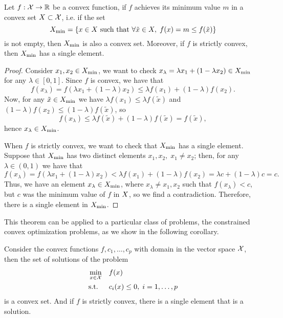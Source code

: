 \begin{theorem}
    Let $f: \mathcal{X} \to \mathbb{R}$ be a convex function, if $f$ achieves its minimum value $m$ in a convex set $X \subset \mathcal{X}$, i.e. if the set 
    $$ X_{\min} = \left\{x \in X \text{ such that }  \forall \tilde{x} \in X, \;  f(x) = m \leq f(\tilde{x})\right\}$$
    is not empty, then $X_{\min}$ is also a convex set. 
    Moreover, if $f$ is strictly convex, then $X_{\min}$ has a single element.
\end{theorem}
\begin{proof}
    Consider $x_1, x_2 \in X_{\min}$, we want to check $x_\lambda = \lambda x_1 + (1 - \lambda x_2) \in X_{\min}$ for any $\lambda \in [0, 1]$.
    Since $f$ is convex, we have that
    \begin{equation}
        \nonumber
        f(x_\lambda) = f(\lambda x_1 + (1 - \lambda) x_2) \leq \lambda f(x_1) + (1 - \lambda) f(x_2) .
    \end{equation}
    Now, for any $\tilde{x} \in X_{\min}$ we have $\lambda f(x_1) \leq \lambda f(\tilde{x})$ and $(1 - \lambda) f(x_2) \leq (1 - \lambda) f(\tilde{x})$, so 
    $$f(x_\lambda) \leq  \lambda f(\tilde{x}) + (1 - \lambda) f(\tilde{x}) = f(\tilde{x}),$$ hence $x_\lambda \in X_{\min}$.

    When $f$ is strictly convex, we want to check that $X_{\min}$ has a single element. Suppose that $X_{\min}$ has two distinct elements $x_1, x_2, \; x_1 \neq x_2$; then, for any $\lambda \in (0, 1)$ we have that 
    $$ f(x_\lambda) = f(\lambda x_1 + (1 - \lambda) x_2) < \lambda f(x_1) + (1 - \lambda) f(x_2) = \lambda c + (1- \lambda)c = c.$$
    Thus, we have an element $x_\lambda \in X_{\min}$, where $x_\lambda \neq x_1, x_2$ such that $f(x_\lambda) < c$, but $c$ was the minimum value of $f$ in $X$, so we find a contradiction. Therefore, there is a single element in $X_{\min}$.
\end{proof}
This theorem can be applied to a particular class of problems, the constrained convex optimization problems, as we show in the following corollary.
\begin{corollary}
    Consider the convex functions $f, c_1, \ldots, c_p$ with domain in the vector space $\mathcal{X}$, then the set of solutions of the problem
    \begin{equation}\nonumber
        \begin{aligned}
            &\min_{x \in \mathcal{X}} & & f(x) \\
            & \text{s.t.} & & c_i(x) \leq 0,\; i=1, \ldots, p 
        \end{aligned}
    \end{equation}
    is a convex set. And if $f$ is strictly convex, there is a single element that is a solution.
\end{corollary}
